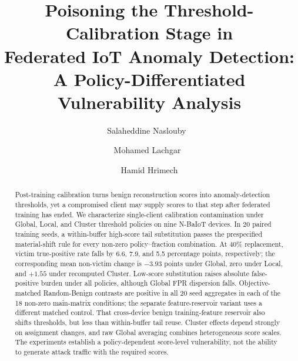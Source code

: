 \documentclass[runningheads]{llncs}
\renewcommand{\orcidID}[1]{\,\orcidlink{#1}}
\newcommand{\GLOBAL}{Global\xspace}
\newcommand{\LOCAL}{Local\xspace}
\newcommand{\CLUSTER}{Cluster\xspace}
\begin{document}
\title{Poisoning the Threshold-Calibration Stage in\texorpdfstring{\\}{ }Federated IoT Anomaly Detection:\texorpdfstring{\\}{ }A Policy-Differentiated Vulnerability Analysis}

\author{
Salaheddine Naslouby\orcidID{0009-0002-7295-7816}~\and
Mohamed Lachgar~\and
Hamid Hrimech
}



\maketitle

\begin{abstract}
Post-training calibration turns benign reconstruction scores into anomaly-detection thresholds, yet a compromised client may supply scores to that step after federated training has ended. We characterize single-client calibration contamination under \GLOBAL, \LOCAL, and \CLUSTER threshold policies on nine N-BaIoT devices. In 20 paired training seeds, a within-buffer high-score tail substitution passes the prespecified material-shift rule for every non-zero policy--fraction combination. At 40\% replacement, victim true-positive rate falls by 6.6, 7.9, and 5.5 percentage points, respectively; the corresponding mean non-victim change is $-3.93$ points under Global, zero under Local, and $+1.55$ under recomputed Cluster. Low-score substitution raises absolute false-positive burden under all policies, although Global FPR dispersion falls. Objective-matched Random-Benign contrasts are positive in all 20 seed aggregates in each of the 18 non-zero main-matrix conditions; the separate feature-reservoir variant uses a different matched control. That cross-device benign training-feature reservoir also shifts thresholds, but less than within-buffer tail reuse. Cluster effects depend strongly on assignment changes, and raw Global averaging combines heterogeneous score scales. The experiments establish a policy-dependent score-level vulnerability, not the ability to generate attack traffic with the required scores.

\end{abstract}
\end{document}
